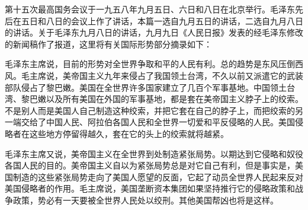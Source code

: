 \begin{maonote}
第十五次最高国务会议于一九五八年九月五日、六日和八日在北京举行。毛泽东先后在五日和八日的会议上作了讲话，本篇一选自九月五日的讲话，二选自九月八日的讲话。关于毛泽东九月八日的讲话，九月九日《人民日报》发表的经毛泽东修改的新闻稿作了报道，这里将有关国际形势部分摘录如下：

毛泽东主席说，目前的形势对全世界争取和平的人民有利。总的趋势是东风压倒西风。毛主席说，美帝国主义九年来侵占了我国领土台湾，不久以前又派遣它的武装部队侵占了黎巴嫩。美国在全世界许多国家建立了几百个军事基地。中国领土台湾、黎巴嫩以及所有美国在外国的军事基地，都是套在美帝国主义脖子上的绞索。不是别人而是美国人自己制造这种绞索，并把它套在自己的脖子上，而把绞索的另一端交给了中国人民、阿拉伯各国人民和全世界一切爱和平反侵略的人民。美国侵略者在这些地方停留得越久，套在它的头上的绞索就将越紧。

毛泽东主席又说，美帝国主义在全世界到处制造紧张局势。以期达到它侵略和奴役各国人民的目的。美帝国主义自以为紧张局势总是对它自己有利，但是事实是，美国制造的这些紧张局势走向了美国人愿望的反面，它起了动员全世界人民起来反对美国侵略者的作用。毛主席说，美国垄断资本集团如果坚持推行它的侵略政策和战争政策，势必有一天要被全世界人民处以绞刑。其他美国帮凶也将是这样。


\end{maonote}
